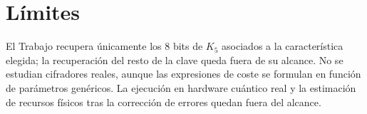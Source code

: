 \section{Límites}

El Trabajo recupera únicamente los 8 bits de \(K_5\) asociados a la característica elegida; la recuperación del resto de la clave queda fuera de su alcance. No se estudian cifradores reales, aunque las expresiones de coste se formulan en función de parámetros genéricos. La ejecución en hardware cuántico real y la estimación de recursos físicos tras la corrección de errores quedan fuera del alcance.
